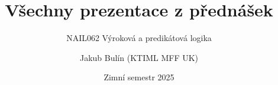 \documentclass[handout]{beamer}
\title{Všechny prezentace z přednášek}
\subtitle{NAIL062 Výroková a predikátová logika}
\author{Jakub Bulín (KTIML MFF UK)}
\date{Zimní semestr 2025}
\begin{document}
\maketitle

\renewcommand{\maketitle}{}













\end{document}
